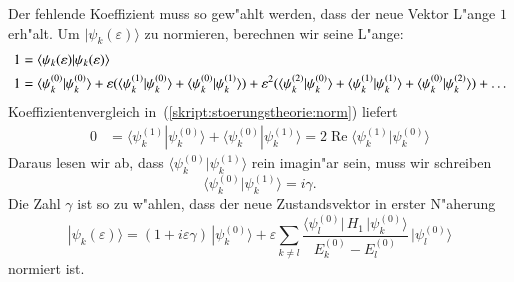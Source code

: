 Der fehlende Koeffizient muss so gew"ahlt werden, dass der neue
Vektor L"ange $1$ erh"alt.
Um $|\psi_k(\varepsilon)\rangle$ zu normieren, berechnen wir seine L"ange:
\begin{align}
1
&=
\langle\psi_k(\varepsilon)|\psi_k(\varepsilon)\rangle
\notag
\\
1
&=
\langle \psi_k^{(0)}|\psi_k^{(0)}\rangle
+
\varepsilon(
\langle \psi_k^{(1)}|\psi_k^{(0)}\rangle
+
\langle \psi_k^{(0)}|\psi_k^{(1)}\rangle
)
+
\varepsilon^2(
\langle \psi_k^{(2)}|\psi_k^{(0)}\rangle
+
\langle \psi_k^{(1)}|\psi_k^{(1)}\rangle
+
\langle \psi_k^{(0)}|\psi_k^{(2)}\rangle
)
+\dots
\label{skript:stoerungstheorie:norm}
\end{align}
Koeffizientenvergleich in~(\ref{skript:stoerungstheorie:norm}) liefert
\begin{align*}
0
&=
\langle \psi_k^{(1)}|\psi_k^{(0)}\rangle
+
\langle \psi_k^{(0)}|\psi_k^{(1)}\rangle
=
2\operatorname{Re}\langle \psi_k^{(1)}|\psi_k^{(0)}\rangle
\end{align*}
Daraus lesen wir ab, dass $\langle\psi_k^{(0)}|\psi_k^{(1)}\rangle$
rein imagin"ar sein, muss wir schreiben
\[
\langle\psi_k^{(0)}|\psi_k^{(1)}\rangle = i\gamma.
\]
Die Zahl $\gamma$ ist so zu w"ahlen, dass der neue Zustandsvektor
in erster N"aherung
\begin{equation}
|\psi_k(\varepsilon)\rangle
=
(1+i\varepsilon \gamma)
\,|\psi_k^{(0)}\rangle
+
\varepsilon
\sum_{k\ne l}
\frac{\langle \psi_l^{(0)}|\, H_1 \,|\psi_k^{(0)}\rangle}{E_k^{(0)}-E_l^{(0)}}
\,
|\psi_l^{(0)}\rangle
\end{equation}
normiert ist.

